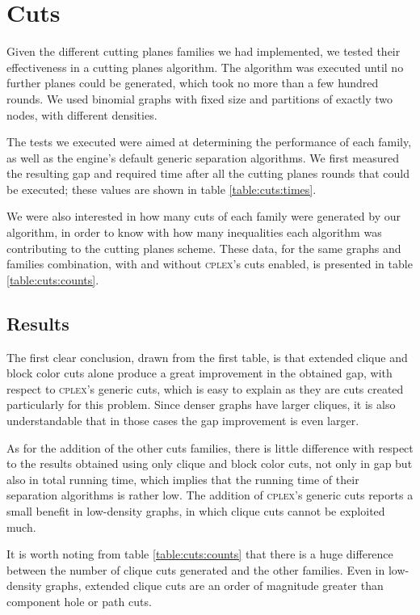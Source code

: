 
\section{Cuts}
\label{subsec:resultscuts}

Given the different cutting planes families we had implemented, we tested their effectiveness in a cutting planes algorithm. The algorithm was executed until no further planes could be generated, which took no more than a few hundred rounds. We used binomial graphs with fixed size and partitions of exactly two nodes, with different densities.

The tests we executed were aimed at determining the performance of each family, as well as the engine's default generic separation algorithms. We first measured the resulting gap and required time after all the cutting planes rounds that could be executed; these values are shown in table \ref{table:cuts:times}.

We were also interested in how many cuts of each family were generated by our algorithm, in order to know with how many inequalities each algorithm was contributing to the cutting planes scheme. These data, for the same graphs and families combination, with and without \textsc{cplex}'s cuts enabled, is presented in table \ref{table:cuts:counts}.

\subsection{Results}

The first clear conclusion, drawn from the first table, is that extended clique and block color cuts alone produce a great improvement in the obtained gap, with respect to \textsc{cplex}'s generic cuts, which is easy to explain as they are cuts created particularly for this problem. Since denser graphs have larger cliques, it is also understandable that in those cases the gap improvement is even larger.

As for the addition of the other cuts families, there is little difference with respect to the results obtained using only clique and block color cuts, not only in gap but also in total running time, which implies that the running time of their separation algorithms is rather low. The addition of \textsc{cplex}'s generic cuts reports a small benefit in low-density graphs, in which clique cuts cannot be exploited much.

It is worth noting from table \ref{table:cuts:counts} that there is a huge difference between the number of clique cuts generated and the other families. Even in low-density graphs, extended clique cuts are an order of magnitude greater than component hole or path cuts. 

